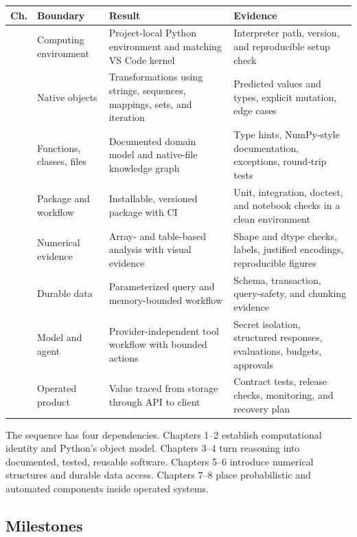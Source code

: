 \begin{longtable}{@{}
  >{\raggedright\arraybackslash}p{}
  >{\raggedright\arraybackslash}p{}
  >{\raggedright\arraybackslash}p{}
  >{\raggedright\arraybackslash}p{}@{}}
\toprule
\textbf{Ch.} & \textbf{Boundary} & \textbf{Result} &
\textbf{Evidence} \\
\midrule
\endhead
1 & Computing environment & Project-local Python environment and matching VS
Code kernel & Interpreter path, version, and reproducible setup check \\
2 & Native objects & Transformations using strings, sequences, mappings, sets,
and iteration & Predicted values and types, explicit mutation, edge cases \\
3 & Functions, classes, files & Documented domain model and native-file
knowledge graph & Type hints, NumPy-style documentation, exceptions,
round-trip tests \\
4 & Package and workflow & Installable, versioned package with CI & Unit,
integration, doctest, and notebook checks in a clean environment \\
5 & Numerical evidence & Array- and table-based analysis with visual evidence &
Shape and dtype checks, labels, justified encodings, reproducible figures \\
6 & Durable data & Parameterized query and memory-bounded workflow & Schema,
transaction, query-safety, and chunking evidence \\
7 & Model and agent & Provider-independent tool workflow with bounded actions &
Secret isolation, structured responses, evaluations, budgets, approvals \\
8 & Operated product & Value traced from storage through API to client &
Contract tests, release checks, monitoring, and recovery plan \\
\bottomrule
\end{longtable}

The sequence has four dependencies. Chapters 1--2 establish computational
identity and Python's object model. Chapters 3--4 turn reasoning into documented,
tested, reusable software. Chapters 5--6 introduce numerical structures and
durable data access. Chapters 7--8 place probabilistic and automated components
inside operated systems.

\subsection{Milestones}

